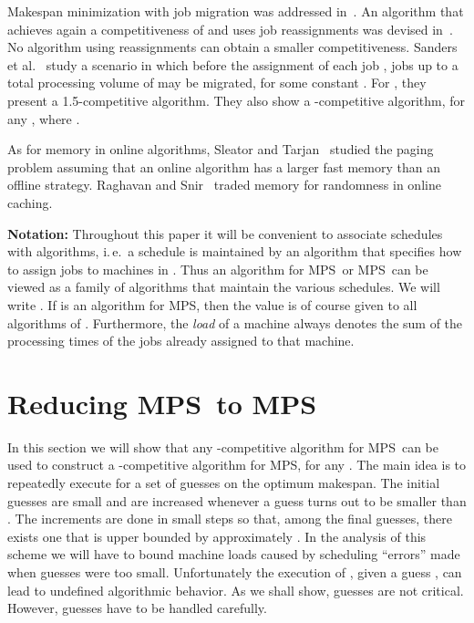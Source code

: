 \documentclass{llncs}
\newcommand{\MPS}{{\rm MPS}}
\newcommand{\MPSO}{{\rm MPS}}
\begin{document}
Makespan minimization with job migration was addressed in~\cite{AH,SSS}. An algorithm that
achieves again a competitiveness of  and uses  job
reassignments was devised in~\cite{AH}. No algorithm using  reassignments can obtain
a smaller competitiveness. Sanders et al.~\cite{SSS} study a  scenario in which before the assignment 
of each job , jobs up to a total processing volume of  may be migrated, for some constant
. For , they present a 1.5-competitive algorithm. They also show a -competitive
algorithm, for any , where . 

As for memory in online algorithms, Sleator and Tarjan~\cite{ST} studied the paging problem assuming that an
online algorithm has a larger fast memory than an offline strategy. Raghavan and Snir~\cite{RS} traded memory for randomness 
in online caching. 

{\bf Notation:} Throughout this paper it will be convenient to associate schedules with algorithms, i.\,e.\ a 
schedule  is maintained by an algorithm  that specifies how to assign jobs to machines in . Thus an
algorithm  for \MPS\ or \MPSO\ can be viewed as a family  of algorithms 
that maintain the various schedules. We will write . If  is an 
algorithm for \MPSO, then the value  is of course given to all algorithms of . 
Furthermore, the {\em load\/} of a machine always denotes the sum of the processing
times of the jobs already assigned to that machine.

\section{Reducing \MPS\ to \MPSO}\label{sec:redu}

In this section we will show that any -competitive algorithm  for \MPSO\ can 
be used to construct a -competitive algorithm  for \MPS, for any . 
The main idea is to repeatedly execute  for a set of guesses on the optimum makespan.
The initial guesses are small and are increased whenever a guess turns out to be smaller than . 
The increments are done in small steps so that, among the final guesses, there exists one that is upper bounded
by approximately . In the analysis of this scheme we will have to bound machine
loads caused by scheduling ``errors'' made when guesses were too small.
Unfortunately the execution of , given a guess , can lead to undefined
algorithmic behavior. As we shall show,
guesses  are not critical. However, guesses  have to be handled 
carefully. 
\end{document}
